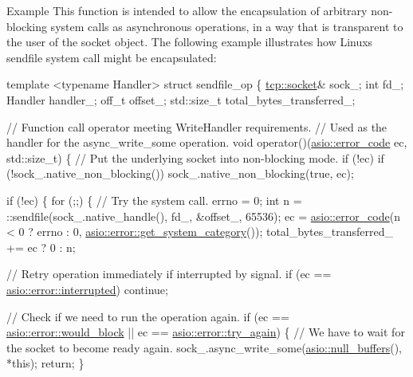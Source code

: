 \begin{DoxyParagraph}{Example}
This function is intended to allow the encapsulation of arbitrary non-\/blocking system calls as asynchronous operations, in a way that is transparent to the user of the socket object. The following example illustrates how Linux\textquotesingle{}s {\ttfamily sendfile} system call might be encapsulated\+: 
\begin{DoxyCode}
 \textcolor{keyword}{template} <\textcolor{keyword}{typename} Handler>
\textcolor{keyword}{struct }sendfile\_op
\{
  \hyperlink{namespacewebsocketpp_1_1transport_1_1asio_1_1socket_1_1error_a828ddaa5ed63a761e1b557465a35f05aa0c31b356014843e1d09514e794a539a7}{tcp::socket}& sock\_;
  \textcolor{keywordtype}{int} fd\_;
  Handler handler\_;
  off\_t offset\_;
  std::size\_t total\_bytes\_transferred\_;

  \textcolor{comment}{// Function call operator meeting WriteHandler requirements.}
  \textcolor{comment}{// Used as the handler for the async\_write\_some operation.}
  \textcolor{keywordtype}{void} operator()(\hyperlink{classasio_1_1error__code}{asio::error\_code} ec, std::size\_t)
  \{
    \textcolor{comment}{// Put the underlying socket into non-blocking mode.}
    \textcolor{keywordflow}{if} (!ec)
      \textcolor{keywordflow}{if} (!sock\_.native\_non\_blocking())
        sock\_.native\_non\_blocking(\textcolor{keyword}{true}, ec);

    \textcolor{keywordflow}{if} (!ec)
    \{
      \textcolor{keywordflow}{for} (;;)
      \{
        \textcolor{comment}{// Try the system call.}
        errno = 0;
        \textcolor{keywordtype}{int} n = ::sendfile(sock\_.native\_handle(), fd\_, &offset\_, 65536);
        ec = \hyperlink{classasio_1_1error__code}{asio::error\_code}(n < 0 ? errno : 0,
            \hyperlink{namespaceasio_1_1error_ab830b9c09076398a1b0e72f619eb0204}{asio::error::get\_system\_category}());
        total\_bytes\_transferred\_ += ec ? 0 : n;

        \textcolor{comment}{// Retry operation immediately if interrupted by signal.}
        \textcolor{keywordflow}{if} (ec == \hyperlink{namespaceasio_1_1error_a2a69445eee784059ac2f4a6c4f5fe90da949a87be73ee9cdca623f92fb27cd45c}{asio::error::interrupted})
          \textcolor{keywordflow}{continue};

        \textcolor{comment}{// Check if we need to run the operation again.}
        \textcolor{keywordflow}{if} (ec == \hyperlink{namespaceasio_1_1error_a2a69445eee784059ac2f4a6c4f5fe90da8e8ff1984495eb85ec17c37e3e5a89e5}{asio::error::would\_block}
            || ec == \hyperlink{namespaceasio_1_1error_a2a69445eee784059ac2f4a6c4f5fe90da6e9965827dc7afaba3b2b90a02b19058}{asio::error::try\_again})
        \{
          \textcolor{comment}{// We have to wait for the socket to become ready again.}
          sock\_.async\_write\_some(\hyperlink{classasio_1_1null__buffers}{asio::null\_buffers}(), *\textcolor{keyword}{this});
          \textcolor{keywordflow}{return};
        \}


\end{DoxyCode}
\end{DoxyParagraph}
